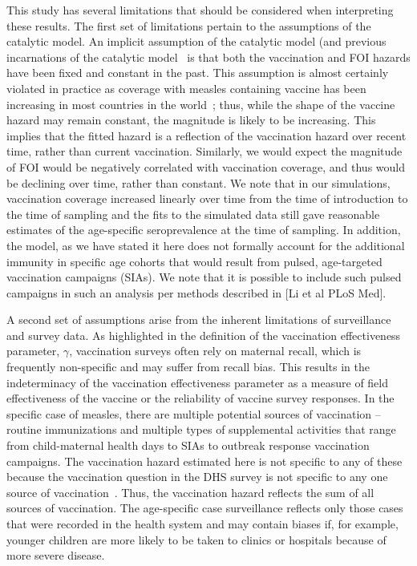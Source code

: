 \documentclass[nofootinbib,aps,pre,twocolumn,superscriptaddress,showkeys,showpacs]{revtex4-1}
\begin{document}
This study has several limitations that should be considered when interpreting these results.  The first set of limitations pertain to the assumptions of the catalytic model. An implicit assumption of the catalytic model (and previous incarnations of the catalytic model~\cite{griffiths_catalytic_1974, Grenfell1985, whitaker_estimation_2004} is that both the vaccination and FOI hazards have been fixed and constant in the past.  This assumption is almost certainly violated in practice as coverage with measles containing vaccine has been increasing in most countries in the world~\cite{perry_global_2014}; thus, while the shape of the vaccine hazard may remain constant, the magnitude is likely to be increasing.  This implies that the fitted hazard is a reflection of the vaccination hazard over recent time, rather than current vaccination.  Similarly, we would expect the magnitude of FOI would be negatively correlated with vaccination coverage, and thus would be declining over time, rather than constant.  We note that in our simulations, vaccination coverage increased linearly over time from the time of introduction to the time of sampling and the fits to the simulated data still gave reasonable estimates of the age-specific seroprevalence at the time of sampling. In addition, the model, as we have stated it here does not formally account for the additional immunity in specific age cohorts that would result from pulsed, age-targeted vaccination campaigns (SIAs). We note that it is possible to include such pulsed campaigns in such an analysis per methods described in [Li et al PLoS Med].

A second set of assumptions arise from the inherent limitations of surveillance and survey data. As highlighted in the definition of the vaccination effectiveness parameter, $\gamma$, vaccination surveys often rely on maternal recall, which is frequently non-specific and may suffer from recall bias.  This results in the indeterminacy of the vaccination effectiveness parameter as a measure of field effectiveness of the vaccine or the reliability of vaccine survey responses. In the specific case of measles, there are multiple potential sources of vaccination -- routine immunizations and multiple types of supplemental activities that range from child-maternal health days to SIAs to outbreak response vaccination campaigns. The vaccination hazard estimated here is not specific to any of these because the vaccination question in the DHS survey is not specific to any one source of vaccination~\cite{takahashi_geography_2017, metcalf_transport_2015}.  Thus, the vaccination hazard reflects the sum of all sources of vaccination. The age-specific case surveillance reflects only those cases that were recorded in the health system and may contain biases if, for example, younger children are more likely to be taken to clinics or hospitals because of more severe disease. 
\end{document}
